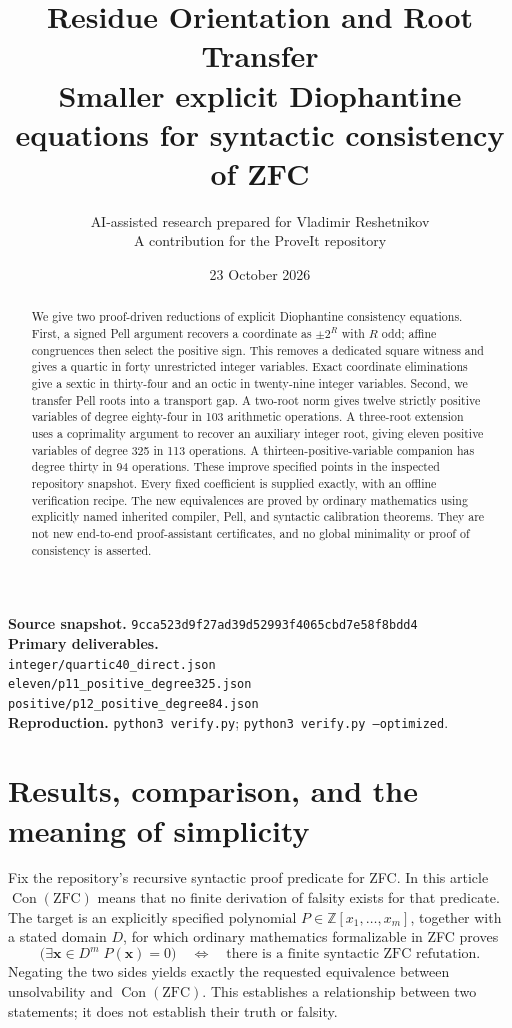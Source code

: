 \documentclass[11pt,letterpaper]{article}
\title{\textbf{Residue Orientation and Root Transfer}\\[5pt]
\large Smaller explicit Diophantine equations for syntactic consistency of ZFC}
\author{AI-assisted research prepared for Vladimir Reshetnikov\\
\small A contribution for the ProveIt repository}
\date{23 October 2026}
\theoremstyle{remark}
\newcommand{\Z}{\mathbb Z}
\newcommand{\Con}{\operatorname{Con}}
\begin{document}
\maketitle
\thispagestyle{empty}
\begin{abstract}
We give two proof-driven reductions of explicit Diophantine consistency
equations.  First, a signed Pell argument recovers a coordinate as
$\pm2^R$ with $R$ odd; affine congruences then select the positive sign.
This removes a dedicated square witness and gives a quartic in forty
unrestricted integer variables.  Exact coordinate eliminations give a
sextic in thirty-four and an octic in twenty-nine integer variables.
Second, we transfer Pell roots into a transport gap.  A two-root norm
gives twelve strictly positive variables of degree eighty-four in 103
arithmetic operations.  A three-root extension uses a coprimality argument
to recover an auxiliary integer root, giving eleven positive variables
of degree 325 in 113 operations.  A thirteen-positive-variable companion
has degree thirty in 94 operations.
These improve specified points in the inspected repository snapshot.
Every fixed coefficient is supplied exactly, with an offline verification
recipe.  The new equivalences are proved by ordinary mathematics using
explicitly named inherited compiler, Pell, and syntactic calibration
theorems.  They are not new end-to-end proof-assistant certificates, and
no global minimality or proof of consistency is asserted.
\end{abstract}
\vfill
\noindent\textbf{Source snapshot.}\quad
\texttt{9cca523d9f27ad39d52993f4065cbd7e58f8bdd4}\\
\noindent\textbf{Primary deliverables.}\\
\texttt{integer/quartic40\_direct.json}\\
\texttt{eleven/p11\_positive\_degree325.json}\\
\texttt{positive/p12\_positive\_degree84.json}\\
\noindent\textbf{Reproduction.}\quad
\texttt{python3 verify.py}; \texttt{python3 verify.py --optimized}.
\clearpage
\tableofcontents
\clearpage

\section{Results, comparison, and the meaning of simplicity}
\label{sec:results}

Fix the repository's recursive syntactic proof predicate for ZFC.  In this
article $\Con(\mathrm{ZFC})$ means that no finite derivation of falsity
exists for that predicate.  The target is an explicitly specified
polynomial $P\in\Z[x_1,\ldots,x_m]$, together with a stated domain $D$, for
which ordinary mathematics formalizable in ZFC proves
\begin{equation}
 \bigl(\exists \mathbf x\in D^m\;P(\mathbf x)=0\bigr)
 \quad\Longleftrightarrow\quad
 \text{there is a finite syntactic ZFC refutation}.
 \label{eq:target}
\end{equation}
Negating the two sides yields exactly the requested equivalence between
unsolvability and $\Con(\mathrm{ZFC})$.  This establishes a relationship
between two statements; it does not establish their truth or falsity.
\end{document}
